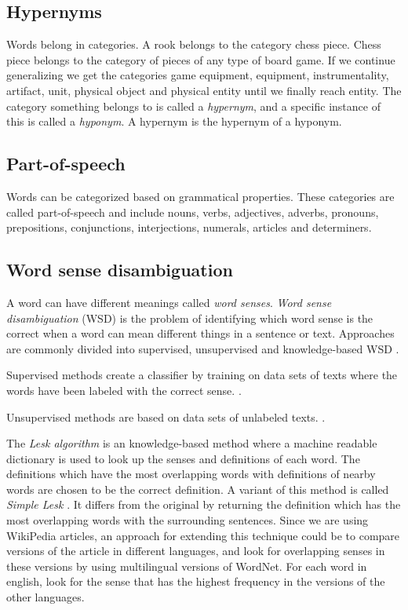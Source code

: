 \subsection{Hypernyms}
Words belong in categories. A rook belongs to the category chess piece. Chess piece belongs to the category of pieces of any type of board game. If we continue generalizing we get the categories game equipment, equipment, instrumentality, artifact, unit, physical object and physical entity until we finally reach entity. The category something belongs to is called a \emph{hypernym}, and a specific instance of this is called a \emph{hyponym}. A hypernym is the hypernym of a hyponym.

\subsection{Part-of-speech}
Words can be categorized based on grammatical properties. These categories are called part-of-speech and include nouns, verbs, adjectives, adverbs, pronouns, prepositions, conjunctions, interjections, numerals, articles and determiners.

\subsection{Word sense disambiguation}
A word can have different meanings called \emph{word senses}. \emph{Word sense disambiguation} (WSD) is the problem of identifying which word sense is the correct when a word can mean different things in a sentence or text. Approaches are commonly divided into supervised, unsupervised and knowledge-based WSD \parencite{navigli2009word}.

Supervised methods create a classifier by training on data sets of texts where the words have been labeled with the correct sense. \parencite{navigli2009word}.

Unsupervised methods are based on data sets of unlabeled texts. \parencite{navigli2009word}. %

The \emph{Lesk algorithm} is an knowledge-based method where a machine readable dictionary is used to look up the senses and definitions of each word. The definitions which have the most overlapping words with definitions of nearby words are chosen to be the correct definition. \parencite{lesk1986automatic} A variant of this method is called \emph{Simple Lesk} \parencite{kilgarriff2000english}. It differs from the original by returning the definition which has the most overlapping words with the surrounding sentences. 
Since we are using WikiPedia articles, an approach for extending this technique could be to compare versions of the article in different languages, and look for overlapping senses in these versions by using multilingual versions of WordNet. For each word in english, look for the sense that has the highest frequency in the versions of the other languages.

